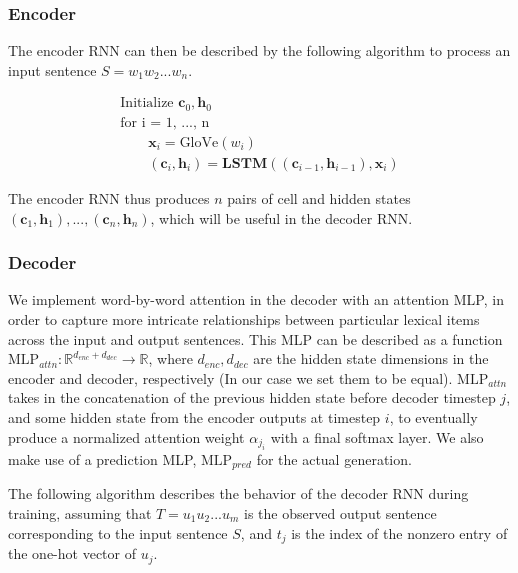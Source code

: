 \documentclass[a4paper, 12pt]{article}
\theoremstyle{definition}
\begin{document}
\subsubsection{Encoder}

The encoder RNN can then be described by the following algorithm to process an input sentence $S = w_1w_2...w_n$.

\begin{gather}
\text{Initialize } \mathbf{c}_0, \mathbf{h}_0 \\
\text{for i = 1, ..., n } \\
	\qquad \mathbf{x}_i = \text{GloVe}(w_i)  \\
	\qquad (\mathbf{c}_{i}, \mathbf{h}_{i}) = \textbf{LSTM}((\mathbf{c}_{i-1}, \mathbf{h}_{i-1}), \mathbf{x}_{i}) 
\end{gather}

The encoder RNN thus produces $n$ pairs of cell and hidden states $(\mathbf{c}_1, \mathbf{h}_1), ..., (\mathbf{c}_n, \mathbf{h}_n)$, which will be useful in the decoder RNN. 

\subsubsection{Decoder}

We implement word-by-word attention in the decoder with an attention MLP, in order to capture more intricate relationships between particular lexical items across the input and output sentences. This MLP can be described as a function $\text{MLP}_{attn} : \mathbb{R}^{d_{enc} + d_{dec}} \to \mathbb{R}$, where $d_{enc}, d_{dec}$ are the hidden state dimensions in the encoder and decoder, respectively (In our case we set them to be equal). $\text{MLP}_{attn}$ takes in the concatenation of the previous hidden state before decoder timestep $j$, and some hidden state from the encoder outputs at timestep $i$, to eventually produce a normalized attention weight $\alpha_{j_{i}}$ with a final softmax layer. We also make use of a prediction MLP, $\text{MLP}_{pred}$ for the actual generation.

\bigskip

 The following algorithm describes the behavior of the decoder RNN during training, assuming that $T = u_1u_2...u_m$ is the observed output sentence corresponding to the input sentence $S$, and $t_j$ is the index of the nonzero entry of the one-hot vector of $u_j$.
\end{document}
